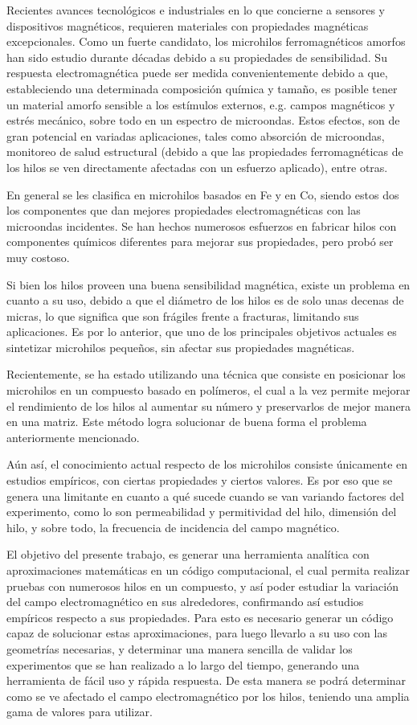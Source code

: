 \documentclass[12pt,letterpaper]{report}
\numberwithin{equation}{section}
\begin{document}
Recientes avances tecnológicos e industriales en lo que concierne a sensores y dispositivos magnéticos, requieren materiales con propiedades magnéticas excepcionales. Como un fuerte candidato, los microhilos ferromagnéticos amorfos han sido estudio durante décadas debido a su propiedades de sensibilidad. Su respuesta electromagnética puede ser medida convenientemente debido a que, estableciendo una determinada composición química y tamaño, es posible tener un material amorfo sensible a los estímulos externos, e.g. campos magnéticos y estrés mecánico, sobre todo en un espectro de microondas. Estos efectos, son de gran potencial en variadas aplicaciones, tales como absorción de microondas, monitoreo de salud estructural (debido a que las propiedades ferromagnéticas de los hilos se ven directamente afectadas con un esfuerzo aplicado), entre otras. 


En general se les clasifica en microhilos basados en Fe y en Co, siendo estos dos los componentes que dan mejores propiedades electromagnéticas con las microondas incidentes. Se han hechos numerosos esfuerzos en fabricar hilos con componentes químicos diferentes para mejorar sus propiedades, pero probó ser muy costoso. \cite{costo} 


Si bien los hilos proveen una buena sensibilidad magnética, existe un problema en cuanto a su uso, debido a que el diámetro de los hilos es de solo unas decenas de micras, lo que significa que son frágiles frente a fracturas, limitando sus aplicaciones. Es por lo anterior, que uno de los principales objetivos actuales es sintetizar microhilos pequeños, sin afectar sus propiedades magnéticas.


Recientemente, se ha estado utilizando una técnica que consiste en posicionar los microhilos en un compuesto basado en polímeros, el cual a la vez permite mejorar el rendimiento de los hilos al aumentar su número y preservarlos de mejor manera en una matriz. Este método logra solucionar de buena forma el problema anteriormente mencionado. \cite{costo}


Aún así, el conocimiento actual respecto de los microhilos consiste únicamente en estudios empíricos, con ciertas propiedades y ciertos valores. Es por eso que se genera una limitante en cuanto a qué sucede cuando se van variando factores del experimento, como lo son permeabilidad y permitividad del hilo, dimensión del hilo, y sobre todo, la frecuencia de incidencia del campo magnético.


El objetivo del presente trabajo, es generar una herramienta analítica con aproximaciones matemáticas en un código computacional, el cual permita realizar pruebas con numerosos hilos en un compuesto, y así poder estudiar la variación del campo electromagnético en sus alrededores, confirmando así estudios empíricos respecto a sus propiedades. Para esto es necesario generar un código capaz de solucionar estas aproximaciones, para luego llevarlo a su uso con las geometrías necesarias, y determinar una manera sencilla de validar los experimentos que se han realizado a lo largo del tiempo, generando una herramienta de fácil uso y rápida respuesta. De esta manera se podrá determinar como se ve afectado el campo electromagnético por los hilos, teniendo una amplia gama de valores para utilizar.
	
\end{document}

